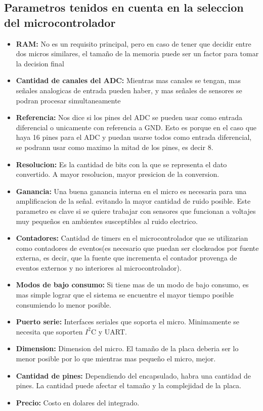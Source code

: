 \documentclass{article}
\theoremstyle{definition}
\theoremstyle{remark}
\begin{document}
\subsection{Parametros tenidos en cuenta en la seleccion del microcontrolador}
\begin{itemize}
  \item \textbf{RAM:} No es un requisito principal, pero en caso de tener que decidir entre dos micros similares, el tamaño de la memoria puede ser un factor para tomar la decision final
  \item \textbf{Cantidad de canales del ADC:} Mientras mas canales se tengan, mas señales analogicas de entrada pueden haber, y mas señales de sensores se podran procesar simultaneamente
  \item \textbf{Referencia:} Nos dice si los pines del ADC se pueden usar como entrada diferencial o unicamente con referencia a GND. Esto es porque en el caso que haya 16 pines para el ADC y puedan usarse todos como entrada diferencial, se podrann usar como maximo la mitad de los pines, es decir 8.
  \item \textbf{Resolucion:} Es la cantidad de bits con la que se representa el dato convertido. A mayor resolucion, mayor presicion de la conversion.
  \item \textbf{Ganancia:} Una buena ganancia interna en el micro es necesaria para una amplificacion de la señal.  evitando la mayor cantidad de ruido posible. Este parametro es clave si se quiere trabajar con sensores que funcionan a voltajes muy pequeños en ambientes susceptibles al ruido electrico.
  \item \textbf{Contadores:} Cantidad de timers en el microcontrolador que se utilizarian como contadores de eventos(es necesario que puedan ser clockeados por fuente externa, es decir, que la fuente que incrementa el contador provenga de eventos externos y no interiores al microcontrolador).
  \item \textbf{Modos de bajo consumo:} Si tiene mas de un modo de bajo consumo, es mas simple lograr que el sistema se encuentre el mayor tiempo posible consumiendo lo menor posible.
  \item \textbf{Puerto serie:} Interfaces seriales que soporta el micro. Minimamente se necesita que soporten $I^{2}$C y UART.
  \item \textbf{Dimension:} Dimension del micro. El tamaño de la placa deberia ser lo menor posible por lo que mientras mas pequeño el micro, mejor.
  \item \textbf{Cantidad de pines:} Dependiendo del encapsulado, habra una cantidad de pines. La cantidad puede afectar el tamaño y la complejidad de la placa.
  \item \textbf{Precio:} Costo en dolares del integrado.
\end{itemize}
\end{document}
